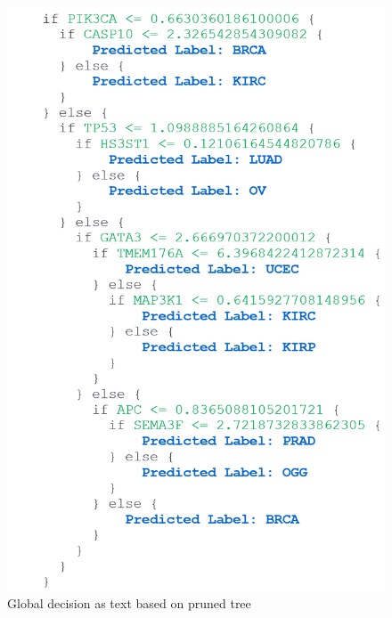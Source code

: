 \begin{figure}
	\centering
		\includegraphics[scale=0.7]{images/dr_global_1.png}
	    \caption{Global decision as text based on pruned tree}
	    \label{fig:skater_decision_as_text}
	    \vspace{-2mm}
\end{figure}

